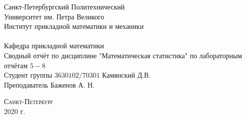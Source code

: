 \documentclass[a4]{article}
\begin{document}



\def\contentsname{\LARGE{Содержание}}
\thispagestyle{empty}
\begin{center} 
\vspace{2cm} 
{\Large \sc Санкт-Петербургский Политехнический}\\
\vspace{2mm}
{\Large \sc Университет} им. {\Large\sc Петра Великого}\\
\vspace{1cm}
{\large \sc Институт прикладной математики и механики\\ 
\vspace{0.5mm}
\textsc{}}\\ 
\vspace{0.5mm}
{\large\sc Кафедра прикладной математики}\\
\vspace{15mm}
{\huge \sc Сводный отчёт по дисциплине "Математическая статистика" по лабораторным отчётам $5-8$\\
\vspace{6mm}
 }
\vspace*{2mm}
\vspace{6cm} 
Студент группы $3630102/70301$ \hfill Камянский Д.В.\\
\vspace{1cm}
Преподаватель \hfill Баженов А. Н.\\
\vspace{20mm} 


\vfill {\large\textsc{Санкт-Петербург}}\\ 
2020 г.
\end{center}


\newpage
\pagestyle{plain}
\end{document}
